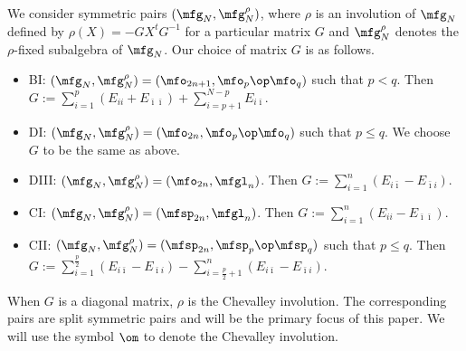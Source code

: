 \documentclass{amsart}
\numberwithin{equation}{section}
\theoremstyle{remark}
\renewcommand{\,}{\kern 0.1em} %
\begin{document}
We consider symmetric pairs $(\mfg_N, \mfg_N^\rho)$, where $\rho$ is an involution of $\mfg_N$ defined by $\rho(X) = -GX^t G^{-1}$ for a particular matrix $G$ and $\mfg_N^\rho$ denotes the $\rho$-fixed subalgebra of $\mfg_N$. Our choice of matrix $G$ is as follows.
%
\begin{itemize}\itemsep0.2em

\item BI:\hspace{0.8em} $(\mfg_N, \mfg_N^\rho) = (\mfo_{2n+1}, \mfo_{p} \op \mfo_{q})$ such that $p< q$. Then $G := \sum_{i=1}^{p} (E_{ii} + E_{\bar \imath \bar \imath}) + \sum_{i=p+1}^{N-p} E_{i \bar\imath}$.

\item DI:\hspace{0.78em} $(\mfg_N, \mfg_N^\rho) = (\mfo_{2n}, \mfo_{p} \op \mfo_{q})$ such that $p\le q$. We choose $G$ to be the same as above. \vspace{0.2em}

\item DIII: $(\mfg_N, \mfg_N^\rho) = (\mfo_{2n}, \mfgl_{n})$. Then $G := \sum_{i=1}^{n} (E_{i\bar\imath} - E_{\bar \imath i})$. \vspace{0.2em}

\item CI:\hspace{0.8em} $(\mfg_N, \mfg_N^\rho) = (\mfsp_{2n}, \mfgl_n)$. Then $G := \sum_{i=1}^{n} (E_{ii} - E_{\bar\imath\bar\imath})$.

\item CII:\hspace{0.49em} $(\mfg_N, \mfg_N^\rho) = (\mfsp_{2n}, \mfsp_{p} \op \mfsp_{q})$ such that $p\le q$. Then $G := \sum_{i=1}^{\frac{p}{2}} (E_{i \bar\imath} - E_{\bar \imath i}) - \sum_{i=\frac{p}{2}+1}^n (E_{i \bar\imath} - E_{\bar \imath i})$.

\end{itemize}
%
When $G$ is a diagonal matrix, $\rho$ is the Chevalley involution. The corresponding pairs
%
%
are split symmetric pairs and will be the primary focus of this paper. We will use the symbol $\om$ to denote the Chevalley involution.

\smallskip
\end{document}
